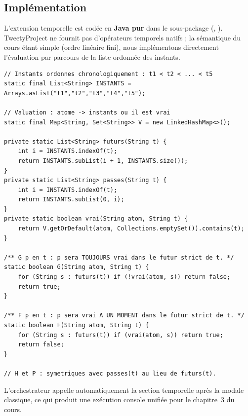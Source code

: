 \subsection{Implémentation}

L'extension temporelle est codée en \textbf{Java pur} dans le sous-package
 (,
). TweetyProject ne fournit pas d'opérateurs
temporels natifs ; la sémantique du cours étant simple (ordre linéaire fini),
nous implémentons directement l'évaluation par parcours de la liste ordonnée
des instants.

\begin{lstlisting}[caption={Opérateurs temporels G, F, H, P (extrait)}]
// Instants ordonnes chronologiquement : t1 < t2 < ... < t5
static final List<String> INSTANTS = Arrays.asList("t1","t2","t3","t4","t5");

// Valuation : atome -> instants ou il est vrai
static final Map<String, Set<String>> V = new LinkedHashMap<>();

private static List<String> futurs(String t) {
    int i = INSTANTS.indexOf(t);
    return INSTANTS.subList(i + 1, INSTANTS.size());
}
private static List<String> passes(String t) {
    int i = INSTANTS.indexOf(t);
    return INSTANTS.subList(0, i);
}
private static boolean vrai(String atom, String t) {
    return V.getOrDefault(atom, Collections.emptySet()).contains(t);
}

/** G p en t : p sera TOUJOURS vrai dans le futur strict de t. */
static boolean G(String atom, String t) {
    for (String s : futurs(t)) if (!vrai(atom, s)) return false;
    return true;
}

/** F p en t : p sera vrai A UN MOMENT dans le futur strict de t. */
static boolean F(String atom, String t) {
    for (String s : futurs(t)) if (vrai(atom, s)) return true;
    return false;
}

// H et P : symetriques avec passes(t) au lieu de futurs(t).
\end{lstlisting}

\noindent L'orchestrateur  appelle automatiquement la
section temporelle après la modale classique, ce qui produit une exécution
console unifiée pour le chapitre~3 du cours.
